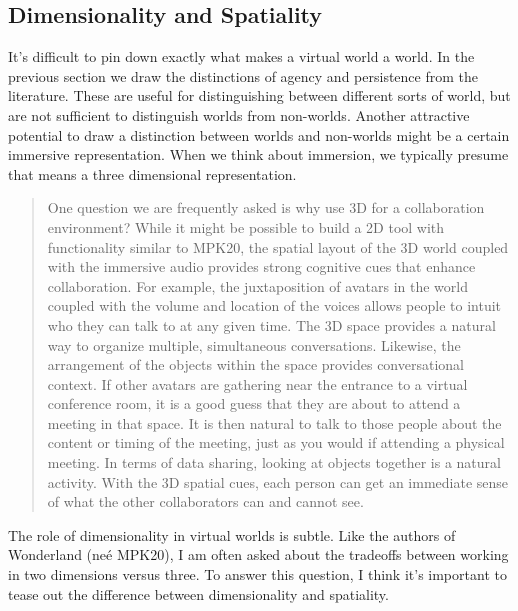 \subsection{Dimensionality and Spatiality}

It's difficult to pin down exactly what makes a virtual world a world. In the previous section we draw the distinctions of agency and persistence from the literature. These are useful for distinguishing between different sorts of world, but are not sufficient to distinguish worlds from non-worlds. Another attractive potential to draw a distinction between worlds and non-worlds might be a certain immersive representation. When we think about immersion, we typically presume that means a three dimensional representation. 

\begin{quotation}
One question we are frequently asked is why use 3D for a collaboration environment? While it might be possible to build a 2D tool with functionality similar to MPK20, the spatial layout of the 3D world coupled with the immersive audio provides strong cognitive cues that enhance collaboration. For example, the juxtaposition of avatars in the world coupled with the volume and location of the voices allows people to intuit who they can talk to at any given time. The 3D space provides a natural way to organize multiple, simultaneous conversations. Likewise, the arrangement of the objects within the space provides conversational context. If other avatars are gathering near the entrance to a virtual conference room, it is a good guess that they are about to attend a meeting in that space. It is then natural to talk to those people about the content or timing of the meeting, just as you would if attending a physical meeting. In terms of data sharing, looking at objects together is a natural activity. With the 3D spatial cues, each person can get an immediate sense of what the other collaborators can and cannot see.\citep{Anonymous:tv}
\end{quotation}


The role of dimensionality in virtual worlds is subtle. Like the authors of Wonderland (neé MPK20), I am often asked about the tradeoffs between working in two dimensions versus three. To answer this question, I think it’s important to tease out the difference between dimensionality and spatiality.

